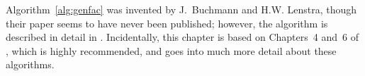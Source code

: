 Algorithm~\ref{alg:genfac} was invented by J.~Buchmann and
H.\thinspace{}W. Lenstra, though their paper seems to have never been
published; however, the algorithm is described in detail in
\cite[\S6.2.5]{cohen:course_ant}.  Incidentally, this chapter is based
on Chapters~4 and~6 of \cite{cohen:course_ant}, which is highly
recommended, and goes into much more detail about these algorithms.




%   
%   
%   
%   
%   
%



